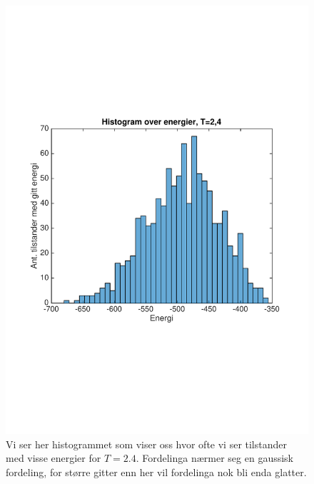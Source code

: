 \documentclass[norsk, 10pt]{article}
\begin{document}
\begin{figure}[H]
	\centering
	\includegraphics[scale = 0.6, trim = 1cm 8cm 1cm 8cm]{histogram_T24_L20.pdf}
	\caption{Vi ser her histogrammet som viser oss hvor ofte vi ser tilstander med visse energier for $T=2.4$. Fordelinga nærmer seg en gaussisk fordeling, for større gitter enn her vil fordelinga nok bli enda glatter.}
	\label{fig:histT24}
\end{figure}
\end{document}
